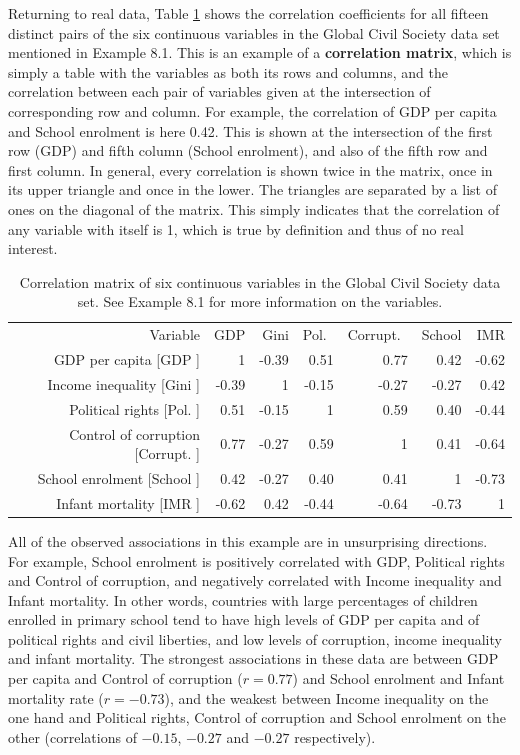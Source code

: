 \documentclass[11pt,a4paper,openany]{book}
\begin{document}
Returning to real data, Table \ref{tab:t-civilsoc-r} shows the
correlation coefficients for all fifteen distinct pairs of the six
continuous variables in the Global Civil Society data set mentioned in
Example 8.1. This is an example of a \textbf{correlation matrix}, which
is simply a table with the variables as both its rows and columns, and
the correlation between each pair of variables given at the intersection
of corresponding row and column. For example, the correlation of GDP per
capita and School enrolment is here 0.42. This is shown at the
intersection of the first row (GDP) and fifth column (School enrolment),
and also of the fifth row and first column. In general, every
correlation is shown twice in the matrix, once in its upper triangle and
once in the lower. The triangles are separated by a list of ones on the
diagonal of the matrix. This simply indicates that the correlation of
any variable with itself is 1, which is true by definition and thus of
no real interest.

\begin{longtable}[]{@{}rrrrrrr@{}}
\caption{\label{tab:t-civilsoc-r} Correlation matrix of six continuous
variables in the Global Civil Society data set. See Example 8.1 for more
information on the variables.}\tabularnewline
\toprule
Variable & GDP & Gini & Pol.~ & Corrupt.~ & School & IMR\tabularnewline
GDP per capita {[}GDP {]} & 1 & -0.39 & 0.51 & 0.77 & 0.42 &
-0.62\tabularnewline
Income inequality {[}Gini {]} & -0.39 & 1 & -0.15 & -0.27 & -0.27 &
0.42\tabularnewline
Political rights {[}Pol. {]} & 0.51 & -0.15 & 1 & 0.59 & 0.40 &
-0.44\tabularnewline
Control of corruption {[}Corrupt. {]} & 0.77 & -0.27 & 0.59 & 1 & 0.41 &
-0.64\tabularnewline
School enrolment {[}School {]} & 0.42 & -0.27 & 0.40 & 0.41 & 1 &
-0.73\tabularnewline
Infant mortality {[}IMR {]} & -0.62 & 0.42 & -0.44 & -0.64 & -0.73 &
1\tabularnewline
\bottomrule
\end{longtable}

All of the observed associations in this example are in unsurprising
directions. For example, School enrolment is positively correlated with
GDP, Political rights and Control of corruption, and negatively
correlated with Income inequality and Infant mortality. In other words,
countries with large percentages of children enrolled in primary school
tend to have high levels of GDP per capita and of political rights and
civil liberties, and low levels of corruption, income inequality and
infant mortality. The strongest associations in these data are between
GDP per capita and Control of corruption (\(r=0.77\)) and School
enrolment and Infant mortality rate (\(r=-0.73\)), and the weakest
between Income inequality on the one hand and Political rights, Control
of corruption and School enrolment on the other (correlations of
\(-0.15\), \(-0.27\) and \(-0.27\) respectively).
\end{document}
